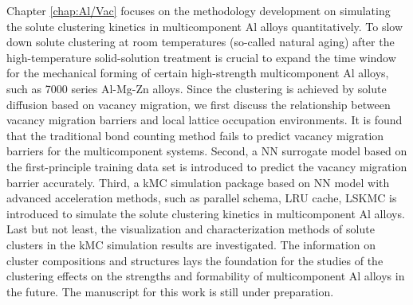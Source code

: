 Chapter \ref{chap:Al/Vac} focuses on the methodology development on simulating the solute clustering kinetics in multicomponent Al alloys quantitatively. To slow down solute clustering at room temperatures (so-called natural aging) after the high-temperature solid-solution treatment is crucial to expand the time window for the mechanical forming of certain high-strength multicomponent Al alloys, such as 7000 series Al-Mg-Zn alloys. Since the clustering is achieved by solute diffusion based on vacancy migration, we first discuss the relationship between vacancy migration barriers and local lattice occupation environments. It is found that the traditional bond counting method fails to predict vacancy migration barriers for the multicomponent systems. Second, a \acf{NN} surrogate model based on the first-principle training data set is introduced to predict the vacancy migration barrier accurately. Third, a \acf{kMC} simulation package based on \ac{NN} model with advanced acceleration methods, such as parallel schema, \acf{LRU} cache, \acf{LSKMC} is introduced to simulate the solute clustering kinetics in multicomponent Al alloys. Last but not least, the visualization and characterization methods of solute clusters in the \ac{kMC} simulation results are investigated. The information on cluster compositions and structures lays the foundation for the studies of the clustering effects on the strengths and formability of multicomponent Al alloys in the future. The manuscript for this work is still under preparation.

